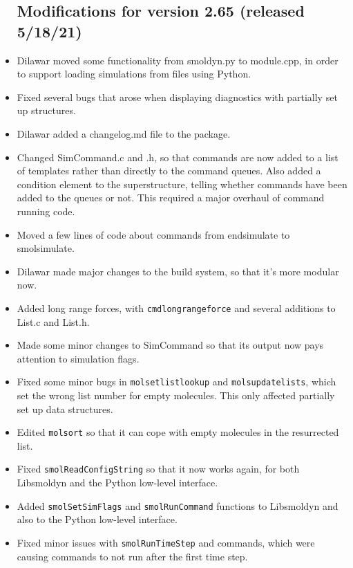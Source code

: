 \documentclass {scrbook}
\newcommand {\ttt} {\texttt}
\begin{document}
\begin{itemize}
\subsection*{Modifications for version 2.65 (released 5/18/21)}
\item Dilawar moved some functionality from smoldyn.py to module.cpp, in order to support loading simulations from files using Python.
\item Fixed several bugs that arose when displaying diagnostics with partially set up structures.
\item Dilawar added a changelog.md file to the package.
\item Changed SimCommand.c and .h, so that commands are now added to a list of templates rather than directly to the command queues. Also added a condition element to the superstructure, telling whether commands have been added to the queues or not. This required a major overhaul of command running code.
\item Moved a few lines of code about commands from endsimulate to smolsimulate.
\item Dilawar made major changes to the build system, so that it's more modular now.
\item Added long range forces, with \ttt{cmdlongrangeforce} and several additions to List.c and List.h.
\item Made some minor changes to SimCommand so that its output now pays attention to simulation flags.
\item Fixed some minor bugs in \ttt{molsetlistlookup} and \ttt{molsupdatelists}, which set the wrong list number for empty molecules. This only affected partially set up data structures.
\item Edited \ttt{molsort} so that it can cope with empty molecules in the resurrected list.
\item Fixed \ttt{smolReadConfigString} so that it now works again, for both Libsmoldyn and the Python low-level interface.
\item Added \ttt{smolSetSimFlags} and \ttt{smolRunCommand} functions to Libsmoldyn and also to the Python low-level interface.
\item Fixed minor issues with \ttt{smolRunTimeStep} and commands, which were causing commands to not run after the first time step.


\end{itemize}
\end{document}
